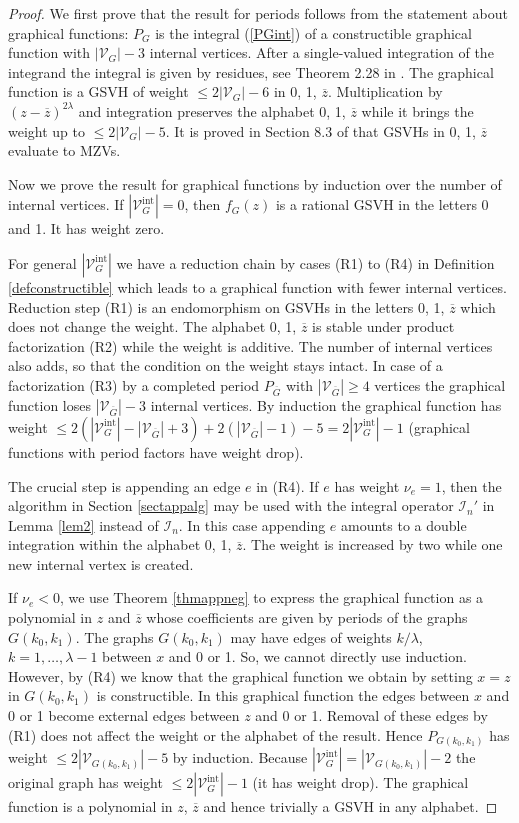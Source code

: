 \documentclass[oneside]{amsart}
\newcommand{\zz}{{\overline{z}}}
\newcommand{\Gg}{{\overline{G}}}
\newcommand{\sI}{\mathcal{I}}
\newcommand{\sV}{\mathcal{V}}
\newcommand{\sVGint}{{\sV_G^\mathrm{int}}}
\newcommand{\VGint}{{|\sVGint|}}
\theoremstyle{plain}
\begin{document}
\begin{proof}
We first prove that the result for periods follows from the statement about graphical functions:
$P_G$ is the integral (\ref{PGint}) of a constructible graphical function with $|\sV_G|-3$ internal vertices. After a single-valued integration of the integrand the integral is given by residues,
see Theorem 2.28 in \cite{gf}. The graphical function is a GSVH of weight $\leq2|\sV_G|-6$ in 0, 1, $\zz$. Multiplication by $(z-\zz)^{2\lambda}$ and integration preserves the alphabet
0, 1, $\zz$ while it brings the weight up to $\leq2|\sV_G|-5$. It is proved in Section 8.3 of \cite{GSVH} that GSVHs in 0, 1, $\zz$ evaluate to MZVs.

Now we prove the result for graphical functions by induction over the number of internal vertices. If $\VGint=0$, then $f_G(z)$ is a rational GSVH in the letters 0 and 1. It has weight zero.

For general $\VGint$ we have a reduction chain by cases (R1) to (R4) in Definition \ref{defconstructible} which leads to a graphical function with fewer internal vertices.
Reduction step (R1) is an endomorphism on GSVHs in the letters 0, 1, $\zz$ which does not change the weight.
The alphabet 0, 1, $\zz$ is stable under product factorization (R2) while the weight is additive. The number of internal vertices also adds, so that the condition on the weight stays intact.
In case of a factorization (R3) by a completed period $P_\Gg$ with $|\sV_\Gg|\geq4$ vertices the graphical function loses $|\sV_\Gg|-3$ internal vertices.
By induction the graphical function has weight $\leq 2(\VGint-|\sV_\Gg|+3)+2(|\sV_\Gg|-1)-5=2\VGint-1$ (graphical functions with period factors have weight drop).

The crucial step is appending an edge $e$ in (R4). If $e$ has weight $\nu_e=1$, then the algorithm in Section \ref{sectappalg} may be used with the integral operator
$\sI_n'$ in Lemma \ref{lem2} instead of $\sI_n$. In this case appending $e$ amounts to a double integration within the alphabet 0, 1, $\zz$. The weight is increased by two \cite{GSVH} while
one new internal vertex is created.

If $\nu_e<0$, we use Theorem \ref{thmappneg} to express the graphical function as a polynomial in $z$ and $\zz$ whose coefficients are given by periods of the graphs $G(k_0,k_1)$.
The graphs $G(k_0,k_1)$ may have edges of weights $k/\lambda$, $k=1,\ldots,\lambda-1$ between $x$ and 0 or 1. So, we cannot directly use induction. However, by (R4) we know that
the graphical function we obtain by setting $x=z$ in $G(k_0,k_1)$ is constructible. In this graphical function the edges between $x$ and 0 or 1
become external edges between $z$ and 0 or 1. Removal of these edges by (R1) does not affect the weight or the alphabet of the result. Hence $P_{G(k_0,k_1)}$ has weight
$\leq2|\sV_{G(k_0,k_1)}|-5$ by induction. Because $\VGint=|\sV_{G(k_0,k_1)}|-2$ the original graph has weight $\leq2\VGint-1$ (it has weight drop). The graphical function is a polynomial
in $z$, $\zz$ and hence trivially a GSVH in any alphabet.
\end{proof}
\end{document}
